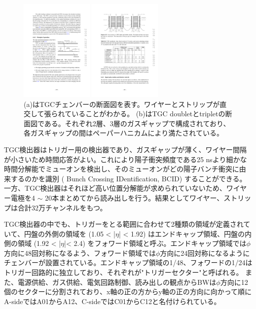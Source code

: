 \begin{figure}
\begin{minipage}[b]{.5\linewidth}
\centering
\includegraphics[height=5cm]{fig/Intro/TGC_structure.pdf}
\end{minipage}%
\begin{minipage}[b]{.5\linewidth}
\centering
\includegraphics[height=5cm]{fig/Intro/TGC_crosssection.pdf}
\end{minipage}%
\caption[TGCチェンバーの断面図]{ (a)はTGCチェンバーの断面図を表す\cite{JINST:2008}。ワイヤーとストリップが直交して張られていることがわかる。 (b)はTGC doubletとtripletの断面図である。それぞれ2層、3層のガスギャップで構成されており、各ガスギャップの間はペーパーハニカムにより満たされている。}
\label{TGC_structure}
\end{figure}

TGC検出器はトリガー用の検出器であり、ガスギャップが薄く、ワイヤー間隔が小さいため時間応答がよい。これにより陽子衝突頻度である25 nsより細かな時間分解能でミューオンを検出し、そのミューオンがどの陽子バンチ衝突に由来するのかを識別 ( Bunch Crossing IDentification, BCID) することができる。一方、TGC検出器はそれほど高い位置分解能が求められていないため、ワイヤー電極を4 $\sim$ 20本まとめてから読み出しを行う。結果としてワイヤー、ストリップは合計32万チャンネルをもつ。

TGC検出器の中でも、トリガーをとる範囲に合わせて2種類の領域が定義されていて、円盤の外側の領域を  (1.05 < |$\eta$| < 1.92) はエンドキャップ領域、円盤の内側の領域  (1.92 < |$\eta$|< 2.4) をフォワード領域と呼ぶ。エンドキャップ領域では$\phi$方向に48回対称になるよう、フォワード領域では$\phi$方向に24回対称になるようにチェンバーが設置されている。エンドキャップ領域の1/48、フォワードの1/24はトリガー回路的に独立しており、それぞれが"トリガーセクター"と呼ばれる。
また、電源供給、ガス供給、電気回路制御、読み出しの観点からBWは$\phi$方向に12個のセクターに分割されており、x軸の正の方からy軸の正の方向に向かって順にA-sideではA01からA12、C-sideではC01からC12と名付けられている。



